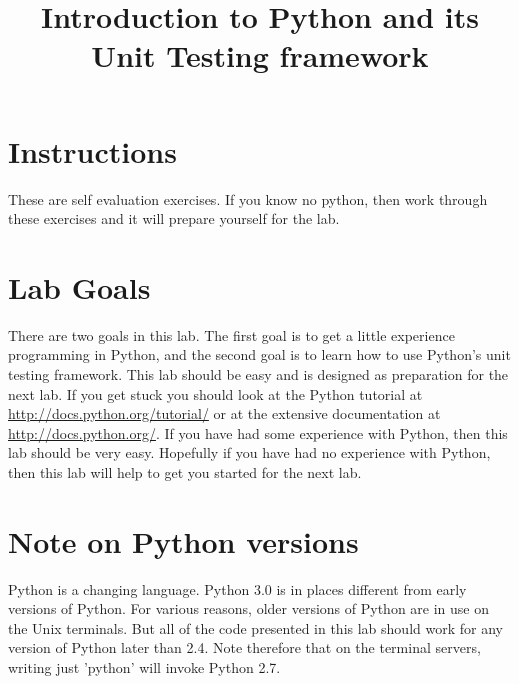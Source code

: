 \documentclass{paper}
\title{Introduction to Python and its Unit Testing framework}
\begin{document}
\maketitle
\section*{Instructions}
These are self evaluation exercises. If you know no python, then work through
these exercises and it will prepare yourself for the lab.
\section*{Lab Goals}
There are two goals in this lab. The first goal is to get a little
experience programming in Python, and the second goal is to learn how
to use Python's unit testing framework. This lab should be easy and is
designed as preparation for the next lab. If you get stuck you should
look at the Python tutorial at \url{http://docs.python.org/tutorial/}
or at the extensive documentation at \url{http://docs.python.org/}. If
you have had some experience with Python, then this lab should be very
easy. Hopefully if you have had no experience with Python, then this
lab will help to get you started for the next lab.
\section*{Note on Python versions}
Python is a changing language. Python 3.0 is in places different from
early versions of Python. For various reasons, older versions of Python are in
use on the Unix terminals. But all of the code presented in this lab should
work for any version of Python later than 2.4.  Note therefore that on the
terminal servers, writing just 'python' will invoke Python 2.7. 
\newpage
\end{document}
